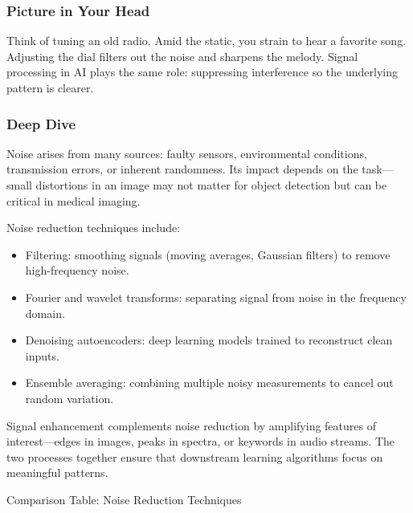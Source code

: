 \documentclass[
  letterpaper,
  DIV=11,
  numbers=noendperiod]{scrreprt}
\providecommand{\tightlist}{%
  \setlength{\itemsep}{0pt}\setlength{\parskip}{0pt}}
\begin{document}
\subsubsection{Picture in Your Head}\label{picture-in-your-head-74}

Think of tuning an old radio. Amid the static, you strain to hear a
favorite song. Adjusting the dial filters out the noise and sharpens the
melody. Signal processing in AI plays the same role: suppressing
interference so the underlying pattern is clearer.

\subsubsection{Deep Dive}\label{deep-dive-74}

Noise arises from many sources: faulty sensors, environmental
conditions, transmission errors, or inherent randomness. Its impact
depends on the task---small distortions in an image may not matter for
object detection but can be critical in medical imaging.

Noise reduction techniques include:

\begin{itemize}
\tightlist
\item
  Filtering: smoothing signals (moving averages, Gaussian filters) to
  remove high-frequency noise.
\item
  Fourier and wavelet transforms: separating signal from noise in the
  frequency domain.
\item
  Denoising autoencoders: deep learning models trained to reconstruct
  clean inputs.
\item
  Ensemble averaging: combining multiple noisy measurements to cancel
  out random variation.
\end{itemize}

Signal enhancement complements noise reduction by amplifying features of
interest---edges in images, peaks in spectra, or keywords in audio
streams. The two processes together ensure that downstream learning
algorithms focus on meaningful patterns.

Comparison Table: Noise Reduction Techniques
\end{document}
